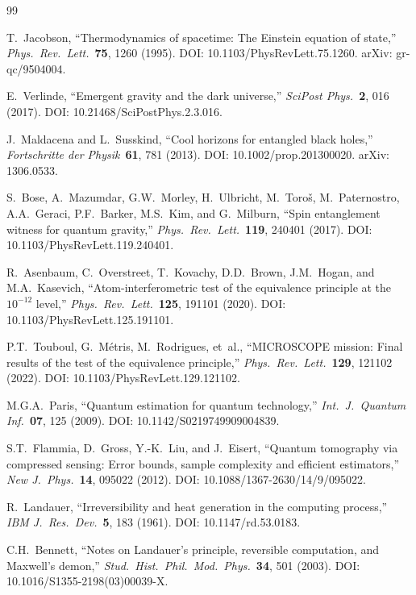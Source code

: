 \documentclass[12pt,letterpaper]{article}
\theoremstyle{plain}
\theoremstyle{definition}
\theoremstyle{remark}
\begin{document}
\begin{thebibliography}{99}

T.~Jacobson,
``Thermodynamics of spacetime: The Einstein equation of state,''
\textit{Phys.\ Rev.\ Lett.}~\textbf{75}, 1260 (1995).
DOI: 10.1103/PhysRevLett.75.1260.
arXiv: gr-qc/9504004.

E.~Verlinde,
``Emergent gravity and the dark universe,''
\textit{SciPost Phys.}~\textbf{2}, 016 (2017).
DOI: 10.21468/SciPostPhys.2.3.016.

J.~Maldacena and L.~Susskind,
``Cool horizons for entangled black holes,''
\textit{Fortschritte der Physik}~\textbf{61}, 781 (2013).
DOI: 10.1002/prop.201300020.
arXiv: 1306.0533.

S.~Bose, A.~Mazumdar, G.W.~Morley, H.~Ulbricht, M.~Toro\v{s},
M.~Paternostro, A.A.~Geraci, P.F.~Barker, M.S.~Kim, and G.~Milburn,
``Spin entanglement witness for quantum gravity,''
\textit{Phys.\ Rev.\ Lett.}~\textbf{119}, 240401 (2017).
DOI: 10.1103/PhysRevLett.119.240401.

R.~Asenbaum, C.~Overstreet, T.~Kovachy, D.D.~Brown,
J.M.~Hogan, and M.A.~Kasevich,
``Atom-interferometric test of the equivalence principle at the
$10^{-12}$ level,''
\textit{Phys.\ Rev.\ Lett.}~\textbf{125}, 191101 (2020).
DOI: 10.1103/PhysRevLett.125.191101.

P.T.~Touboul, G.~M\'etris, M.~Rodrigues, et~al.,
``MICROSCOPE mission: Final results of the test of the equivalence
principle,''
\textit{Phys.\ Rev.\ Lett.}~\textbf{129}, 121102 (2022).
DOI: 10.1103/PhysRevLett.129.121102.

M.G.A.~Paris,
``Quantum estimation for quantum technology,''
\textit{Int.\ J.\ Quantum Inf.}~\textbf{07}, 125 (2009).
DOI: 10.1142/S0219749909004839.

S.T.~Flammia, D.~Gross, Y.-K.~Liu, and J.~Eisert,
``Quantum tomography via compressed sensing: Error bounds,
sample complexity and efficient estimators,''
\textit{New J.\ Phys.}~\textbf{14}, 095022 (2012).
DOI: 10.1088/1367-2630/14/9/095022.

R.~Landauer,
``Irreversibility and heat generation in the computing process,''
\textit{IBM J.\ Res.\ Dev.}~\textbf{5}, 183 (1961).
DOI: 10.1147/rd.53.0183.

C.H.~Bennett,
``Notes on Landauer's principle, reversible computation, and
Maxwell's demon,''
\textit{Stud.\ Hist.\ Phil.\ Mod.\ Phys.}~\textbf{34}, 501 (2003).
DOI: 10.1016/S1355-2198(03)00039-X.


\end{thebibliography}
\end{document}
